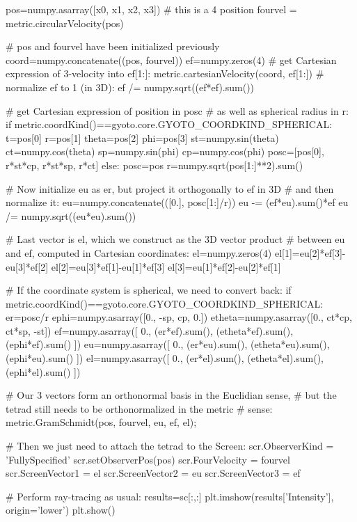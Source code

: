 \documentclass[a4paper,12pt]{article}
\begin{document}
\begin{code}
  pos=numpy.asarray([x0, x1, x2, x3]) # this is a 4 position
  fourvel = metric.circularVelocity(pos)

  # pos and fourvel have been initialized previously
  coord=numpy.concatenate((pos, fourvel))
  ef=numpy.zeros(4)
  # get Cartesian expression of 3-velocity into ef[1:]:
  metric.cartesianVelocity(coord, ef[1:])
  # normalize ef to 1 (in 3D):
  ef /= numpy.sqrt((ef*ef).sum())

  # get Cartesian expression of position in posc
  # as well as spherical radius in r:
  if metric.coordKind()==gyoto.core.GYOTO_COORDKIND_SPHERICAL:
      t=pos[0]
      r=pos[1]
      theta=pos[2]
      phi=pos[3]
      st=numpy.sin(theta)
      ct=numpy.cos(theta)
      sp=numpy.sin(phi)
      cp=numpy.cos(phi)
      posc=[pos[0], r*st*cp, r*st*sp, r*ct]
  else:
      posc=pos
      r=numpy.sqrt(pos[1:]**2).sum()

  # Now initialize eu as er, but project it orthogonally to ef in 3D
  # and then normalize it:    
  eu=numpy.concatenate(([0.], posc[1:]/r))
  eu -= (ef*eu).sum()*ef
  eu /= numpy.sqrt((eu*eu).sum())

  # Last vector is el, which we construct as the 3D vector product
  # between eu and ef, computed in Cartesian coordinates:
  el=numpy.zeros(4)
  el[1]=eu[2]*ef[3]-eu[3]*ef[2]
  el[2]=eu[3]*ef[1]-eu[1]*ef[3]
  el[3]=eu[1]*ef[2]-eu[2]*ef[1]

  # If the coordinate system is spherical, we need to convert back:
  if metric.coordKind()==gyoto.core.GYOTO_COORDKIND_SPHERICAL:
      er=posc/r
      ephi=numpy.asarray([0., -sp, cp, 0.])
      etheta=numpy.asarray([0., ct*cp, ct*sp, -st])
      ef=numpy.asarray([
        0.,
        (er*ef).sum(),
        (etheta*ef).sum(),
        (ephi*ef).sum()
      ])
      eu=numpy.asarray([
        0.,
        (er*eu).sum(),
        (etheta*eu).sum(),
        (ephi*eu).sum()
      ])
      el=numpy.asarray([
        0.,
        (er*el).sum(),
        (etheta*el).sum(),
        (ephi*el).sum()
      ])

  # Our 3 vectors form an orthonormal basis in the Euclidian sense,
  # but the tetrad still needs to be orthonormalized in the metric
  # sense:
  metric.GramSchmidt(pos, fourvel, eu, ef, el);

  # Then we just need to attach the tetrad to the Screen:
  scr.ObserverKind = 'FullySpecified'
  scr.setObserverPos(pos)
  scr.FourVelocity = fourvel
  scr.ScreenVector1 = el
  scr.ScreenVector2 = eu
  scr.ScreenVector3 = ef

  # Perform ray-tracing as usual:
  results=sc[:,:]
  plt.imshow(results['Intensity'], origin='lower')
  plt.show()
 
\end{code}
\end{document}
